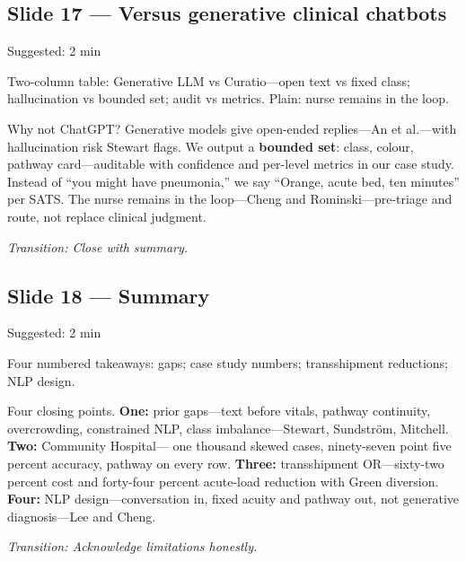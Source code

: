 \documentclass[11pt]{article}
\newcommand{\transition}[1]{\medskip\noindent\textit{\textcolor{knustMuted}{Transition: #1}}\medskip}
\newcommand{\deck}[1]{{\small\texttt{\textcolor{knustMuted}{main.pdf slide: #1}}}}
\newcommand{\slide}[3]{%
  \subsection{Slide #1 --- #2}%
  \noindent\deck{#1 --- #3}\par\smallskip}
\begin{document}
\slide{17}{Versus generative clinical chatbots}{NLP design}
\begin{timing}Suggested: 2 min\end{timing}
\begin{onscreen}
Two-column table: Generative LLM vs Curatio---open text vs fixed class; hallucination vs bounded set; audit vs metrics.
Plain: nurse remains in the loop.
\end{onscreen}
\begin{saybox}
Why not ChatGPT? Generative models give open-ended replies---An et al.---with hallucination risk Stewart
flags. We output a \textbf{bounded set}: class, colour, pathway card---auditable with confidence and
per-level metrics in our case study. Instead of ``you might have pneumonia,'' we say ``Orange, acute bed,
ten minutes'' per SATS. The nurse remains in the loop---Cheng and Rominski---pre-triage and route, not
replace clinical judgment.
\end{saybox}
\transition{Close with summary.}

\slide{18}{Summary}{Conclusion}
\begin{timing}Suggested: 2 min\end{timing}
\begin{onscreen}
Four numbered takeaways: gaps; case study numbers; transshipment reductions; NLP design.
\end{onscreen}
\begin{saybox}
Four closing points. \textbf{One:} prior gaps---text before vitals, pathway continuity, overcrowding,
constrained NLP, class imbalance---Stewart, Sundstr\"om, Mitchell. \textbf{Two:} Community Hospital---
one thousand skewed cases, ninety-seven point five percent accuracy, pathway on every row. \textbf{Three:}
transshipment OR---sixty-two percent cost and forty-four percent acute-load reduction with Green
diversion. \textbf{Four:} NLP design---conversation in, fixed acuity and pathway out, not generative
diagnosis---Lee and Cheng.
\end{saybox}
\transition{Acknowledge limitations honestly.}
\end{document}
